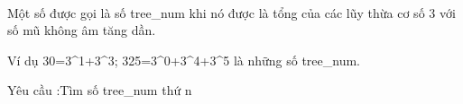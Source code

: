  

Một số được gọi là số tree\_num khi nó được là tổng của các lũy thừa cơ số 3 với số mũ không âm tăng dần.

Ví dụ 30=3^1+3^3; 325=3^0+3^4+3^5 là những số tree\_num.

Yêu cầu :Tìm số tree\_num thứ n

 